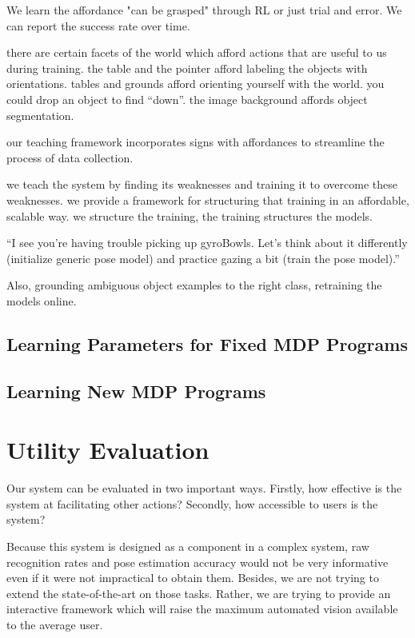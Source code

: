 \documentclass[conference]{IEEEtran}
\begin{document}
We learn the affordance "can be grasped" through RL or just trial and error.
We can report the success rate over time.

there are certain facets of the world which afford actions that are useful to us during 
training. the table and the pointer afford labeling the objects with orientations. 
tables and grounds afford orienting yourself with the world. you could drop an object to 
find “down”. the image background affords object segmentation.

our teaching framework incorporates signs with affordances to streamline the process 
of data collection.

we teach the system by finding its weaknesses and training it to overcome these 
weaknesses. we provide a framework for structuring that training in an affordable, 
scalable way.  we structure the training, the training structures the models.

“I see you’re having trouble picking up gyroBowls. Let’s think about it differently 
(initialize generic pose model) and practice gazing a bit (train the pose model).”

Also, grounding ambiguous object examples to the right class, retraining the models online.

\subsection{Learning Parameters for Fixed MDP Programs}


\subsection{Learning New MDP Programs}


\section{Utility Evaluation}
Our system can be evaluated in two important ways. Firstly, how effective is 
the system at facilitating other actions? Secondly, how accessible to users is the system?

Because this system is designed as a component in a complex system, raw recognition rates
and pose estimation accuracy would not be very informative even if it were not impractical to
obtain them.  Besides, we are not trying to extend the state-of-the-art on those tasks. Rather,
we are trying to provide an interactive framework which will raise the maximum automated vision
available to the average user.
\end{document}
